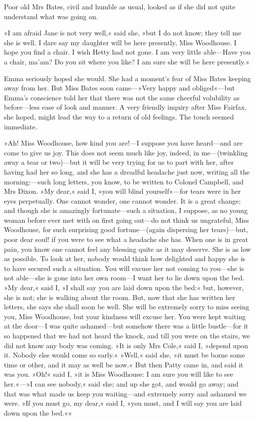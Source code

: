 Poor old Mrs Bates, civil and humble as usual, looked as if she did not quite understand what was going on.

»I am afraid Jane is not very well,« said she, »but I do not know; they tell me she is well. I dare say my daughter will be here presently, Miss Woodhouse. I hope you find a chair. I wish Hetty had not gone. I am very little able—Have you a chair, ma'am? Do you sit where you like? I am sure she will be here presently.«

Emma seriously hoped she would. She had a moment's fear of Miss Bates keeping away from her. But Miss Bates soon came—»Very happy and obliged«—but Emma's conscience told her that there was not the same cheerful volubility as before—less ease of look and manner. A very friendly inquiry after Miss Fairfax, she hoped, might lead the way to a return of old feelings. The touch seemed immediate.

»Ah! Miss Woodhouse, how kind you are!—I suppose you have heard—and are come to give us joy. This does not seem much like joy, indeed, in me—(twinkling away a tear or two)—but it will be very trying for us to part with her, after having had her so long, and she has a dreadful headache just now, writing all the morning:—such long letters, you know, to be written to Colonel Campbell, and Mrs Dixon. »My dear,« said I, »you will blind yourself«—for tears were in her eyes perpetually. One cannot wonder, one cannot wonder. It is a great change; and though she is amazingly fortunate—such a situation, I suppose, as no young woman before ever met with on first going out—do not think us ungrateful, Miss Woodhouse, for such surprising good fortune—(again dispersing her tears)—but, poor dear soul! if you were to see what a headache she has. When one is in great pain, you know one cannot feel any blessing quite as it may deserve. She is as low as possible. To look at her, nobody would think how delighted and happy she is to have secured such a situation. You will excuse her not coming to you—she is not able—she is gone into her own room—I want her to lie down upon the bed. »My dear,« said I, »I shall say you are laid down upon the bed:« but, however, she is not; she is walking about the room. But, now that she has written her letters, she says she shall soon be well. She will be extremely sorry to miss seeing you, Miss Woodhouse, but your kindness will excuse her. You were kept waiting at the door—I was quite ashamed—but somehow there was a little bustle—for it so happened that we had not heard the knock, and till you were on the stairs, we did not know any body was coming. »It is only Mrs Cole,« said I, »depend upon it. Nobody else would come so early.« »Well,« said she, »it must be borne some time or other, and it may as well be now.« But then Patty came in, and said it was you. »Oh!« said I, »it is Miss Woodhouse: I am sure you will like to see her.«—»I can see nobody,« said she; and up she got, and would go away; and that was what made us keep you waiting—and extremely sorry and ashamed we were. »If you must go, my dear,« said I, »you must, and I will say you are laid down upon the bed.««

